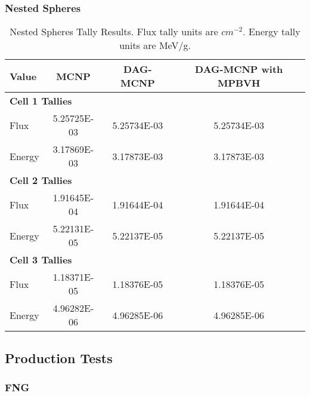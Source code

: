   \subsubsection{Nested Spheres}

  \begin{table}[H]
    \small
    \begin{center}
      \begin{tabular}{lccc}
        \toprule
        Value & MCNP & DAG-MCNP & DAG-MCNP with MPBVH \\
        \toprule
        \multicolumn{4}{l}{\textbf{Cell 1 Tallies}} \\
        \hline
        Flux   & 5.25725E-03 & 5.25734E-03 & 5.25734E-03 \\
        Energy & 3.17869E-03 & 3.17873E-03 & 3.17873E-03 \\
        \hline
        \multicolumn{4}{l}{\textbf{Cell 2 Tallies}}      \\
        \hline
        Flux   & 1.91645E-04 & 1.91644E-04 & 1.91644E-04 \\
        Energy & 5.22131E-05 & 5.22137E-05 & 5.22137E-05 \\
        \hline
        \multicolumn{4}{l}{\textbf{Cell 3 Tallies}}      \\
        \hline
        Flux   & 1.18371E-05 & 1.18376E-05 & 1.18376E-05 \\
        Energy & 4.96282E-06 & 4.96285E-06 & 4.96285E-06 \\
        \bottomrule
      \end{tabular}
      \caption[Nested Spheres Tally Results.]{Nested Spheres Tally Results. Flux
        tally units are $cm^{-2}$. Energy tally units are MeV/g.}
      \label{nestedspheres}
    \end{center}
  \end{table}

\subsection{Production Tests}\label{appsec:mpbvh_production_tests}

\subsubsection{FNG}

